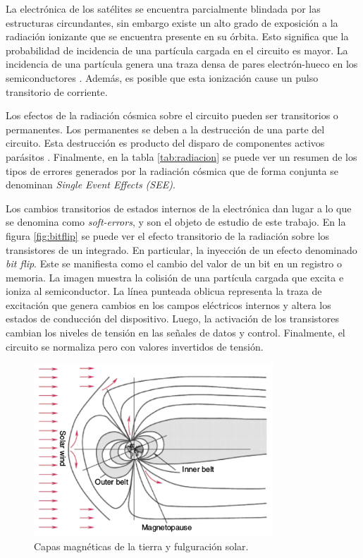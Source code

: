 La electrónica de los satélites se encuentra parcialmente blindada por las estructuras circundantes, sin embargo existe un alto grado de exposición a la radiación ionizante que se encuentra presente en su órbita.
Esto significa que la probabilidad de incidencia de una partícula cargada en el circuito es mayor.
La incidencia de una partícula genera una traza densa de pares electrón-hueco en los semiconductores \citep{ARTICLE:velazco}.
Además, es posible que esta ionización cause un pulso transitorio de corriente.

Los efectos de la radiación cósmica sobre el circuito pueden ser transitorios o permanentes.
Los permanentes se deben a la destrucción de una parte del circuito.
Esta destrucción es producto del disparo de componentes activos parásitos \citep{WEBSITE:effects_on_devices}.
Finalmente, en la tabla \ref{tab:radiacion} se puede ver un resumen de los tipos de errores generados por la radiación cósmica que de forma conjunta se denominan \emph{Single Event Effects (SEE)}.

Los cambios transitorios de estados internos de la electrónica dan lugar a lo que se denomina como \emph{soft-errors}, y son el objeto de estudio de este trabajo.
En la figura \ref{fig:bitflip} se puede ver el efecto transitorio de la radiación sobre los transistores de un integrado.
En particular, la inyección de un efecto denominado \emph{bit flip}.
Este se manifiesta como el cambio del valor de un bit en un registro o memoria.
La imagen muestra la colisión de una partícula cargada que excita e ioniza al semiconductor.
La línea punteada oblicua representa la traza de excitación que genera cambios en los campos eléctricos internos y altera los estados de conducción del dispositivo.
Luego, la activación de los transistores cambian los niveles de tensión en las señales de datos y control.
Finalmente, el circuito se normaliza pero con valores invertidos de tensión.

\begin{figure}[htbp]
	\centering
	\includegraphics[width=0.8\textwidth]{./Figures/vientosolar.jpg}
    \caption{Capas magnéticas de la tierra y fulguración solar\protect\footnotemark.}
	\label{fig:viento}
\end{figure}

